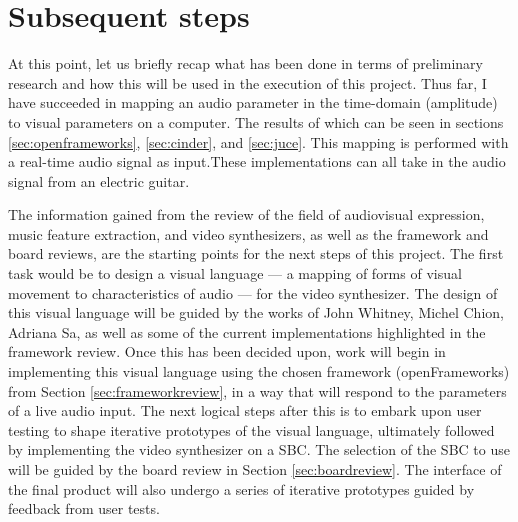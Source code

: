 \documentclass[../initial_thesis.tex]{subfiles}
\begin{document}
\section{Subsequent steps}


At this point, let us briefly recap what has been done in terms of preliminary research and how this will be used in the execution of this project. Thus far, I have succeeded in mapping an audio parameter in the time-domain (amplitude) to visual parameters on a computer. The results of which can be seen in sections \ref{sec:openframeworks}, \ref{sec:cinder}, and \ref{sec:juce}. This mapping is performed with a real-time audio signal as input.\footnotemark These implementations can all take in the audio signal from an electric guitar. \par
{}

The information gained from the review of the field of audiovisual expression, music feature extraction, and video synthesizers, as well as the framework and board reviews, are the starting points for the next steps of this project. The first task would be to design a visual language --- a mapping of forms of visual movement to characteristics of audio --- for the video synthesizer. The design of this visual language will be guided by the works of John Whitney, Michel Chion, Adriana Sa, as well as some of the current implementations highlighted in the framework review. Once this has been decided upon, work will begin in implementing this visual language using the chosen framework (openFrameworks) from Section \ref{sec:frameworkreview}, in a way that will respond to the parameters of a live audio input. The next logical steps after this is to embark upon user testing to shape iterative prototypes of the visual language, ultimately followed by implementing the video synthesizer on a SBC. The selection of the SBC to use will be guided by the board review in Section \ref{sec:boardreview}. The interface of the final product will also undergo a series of iterative prototypes guided by feedback from user tests.
\end{document}
